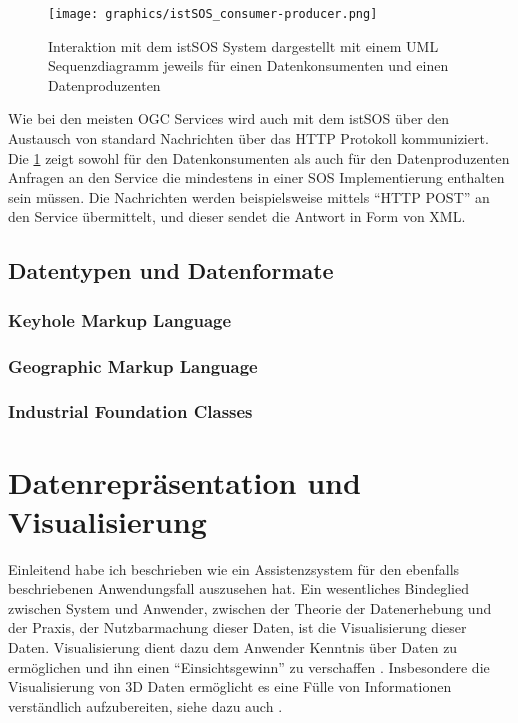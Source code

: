 \begin{figure}[H]
	\centering
 	 \texttt{[image: graphics/istSOS\_consumer-producer.png]} 
	\caption{Interaktion mit dem istSOS System dargestellt mit einem UML Sequenzdiagramm jeweils für einen Datenkonsumenten und einen Datenproduzenten \citep{cannata_welcome_2014}}
	 \label{fig:istsos_consumer-producer}
\end{figure}

Wie bei den meisten \gls{OGC} Services wird auch mit dem \gls{istSOS} über den Austausch von standard Nachrichten über das \gls{HTTP} Protokoll kommuniziert. Die  \ref{fig:istsos_consumer-producer} zeigt sowohl für den Datenkonsumenten als auch für den Datenproduzenten Anfragen an den Service die mindestens in einer \gls{SOS} Implementierung enthalten sein müssen. Die Nachrichten werden beispielsweise mittels ``HTTP POST'' an den Service übermittelt, und dieser sendet die Antwort in Form von \gls{XML}. 


\subsection{Datentypen und Datenformate}
\subsubsection{Keyhole Markup Language}
\subsubsection{Geographic Markup Language}
\subsubsection{Industrial Foundation Classes}

\section{Datenrepräsentation und Visualisierung}
Einleitend habe ich beschrieben wie ein Assistenzsystem für den ebenfalls beschriebenen Anwendungsfall auszusehen hat. Ein wesentliches Bindeglied zwischen System und Anwender, zwischen der Theorie der Datenerhebung und der Praxis, der Nutzbarmachung dieser Daten, ist die Visualisierung dieser Daten. Visualisierung dient dazu dem Anwender Kenntnis über Daten zu ermöglichen und ihn einen ``Einsichtsgewinn'' zu verschaffen \citep{dollner_techniken_2007}. Insbesondere die Visualisierung von 3D Daten ermöglicht es eine Fülle von Informationen verständlich aufzubereiten, siehe dazu auch \citep{wood_using_2005}.

